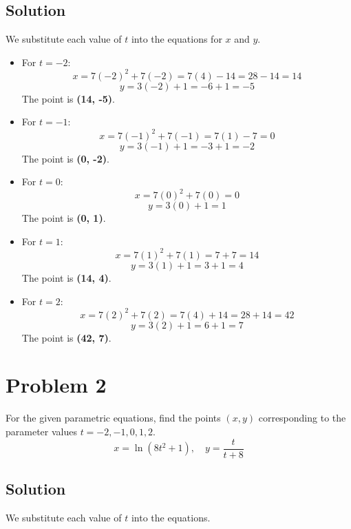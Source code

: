 \documentclass{article}
\begin{document}
\subsection*{Solution}
We substitute each value of $t$ into the equations for $x$ and $y$.

\begin{itemize}
    \item For $t = -2$:
    \[ x = 7(-2)^2 + 7(-2) = 7(4) - 14 = 28 - 14 = 14 \]
    \[ y = 3(-2) + 1 = -6 + 1 = -5 \]
    The point is \textbf{(14, -5)}.

    \item For $t = -1$:
    \[ x = 7(-1)^2 + 7(-1) = 7(1) - 7 = 0 \]
    \[ y = 3(-1) + 1 = -3 + 1 = -2 \]
    The point is \textbf{(0, -2)}.

    \item For $t = 0$:
    \[ x = 7(0)^2 + 7(0) = 0 \]
    \[ y = 3(0) + 1 = 1 \]
    The point is \textbf{(0, 1)}.

    \item For $t = 1$:
    \[ x = 7(1)^2 + 7(1) = 7 + 7 = 14 \]
    \[ y = 3(1) + 1 = 3 + 1 = 4 \]
    The point is \textbf{(14, 4)}.

    \item For $t = 2$:
    \[ x = 7(2)^2 + 7(2) = 7(4) + 14 = 28 + 14 = 42 \]
    \[ y = 3(2) + 1 = 6 + 1 = 7 \]
    The point is \textbf{(42, 7)}.
\end{itemize}

\section{Problem 2}
For the given parametric equations, find the points $(x, y)$ corresponding to the parameter values $t = -2, -1, 0, 1, 2$.
\[ x = \ln(8t^2 + 1), \quad y = \frac{t}{t+8} \]

\subsection*{Solution}
We substitute each value of $t$ into the equations.
\end{document}
